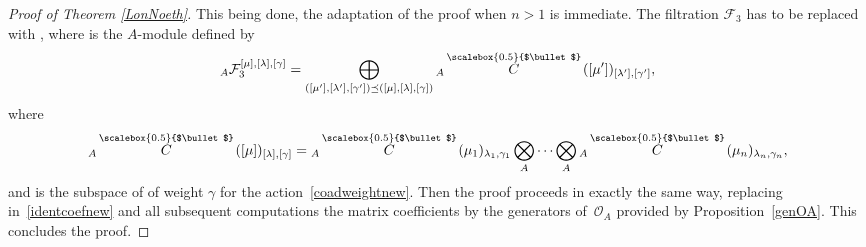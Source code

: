 \documentclass[pdftex]{sigma}
\numberwithin{equation}{section}
\theoremstyle{definition}
\newcommand{\Oo}{{\mathcal O}}
\newcommand{\smallbullet}{%
\vcenter{\hbox{\,\scalebox{0.5}{$\bullet$}\,}}
}
\begin{document}
\begin{proof}[Proof of Theorem \ref{LonNoeth}]
This being done, the adaptation of the proof when $n>1$ is immediate. The filtration $\mathcal{F}_3$ has to be replaced with , where  is the $A$-module defined by
\[
{}_A{\mathcal F}_3^{[\mu],[\lambda],[\gamma]}=\bigoplus_{([\mu'],[\lambda'],[\gamma'])\preceq ([\mu],[\lambda],[\gamma])} {}_A \overset{\raisebox{-1.5pt}{\scriptsize$\smallbullet$}}{C} ([\mu'])_{[\lambda'],[\gamma']},
\]
where
\[
{}_A \overset{\raisebox{-1.5pt}{\scriptsize$\smallbullet$}}{C} ([\mu])_{[\lambda],[\gamma]} ={}_A \overset{\raisebox{-1.5pt}{\scriptsize$\smallbullet$}}{C} (\mu_1)_{\lambda_1,\gamma_1}\bigotimes_A \dots \bigotimes_A {}_A \overset{\raisebox{-1.5pt}{\scriptsize$\smallbullet$}}{C} (\mu_n)_{\lambda_n,\gamma_n},
\]
 and \smash{${}_A \overset{\raisebox{-1.5pt}{\scriptsize$\smallbullet$}}{C} (\mu)_{\lambda,\gamma}$} is the subspace of \smash{${}_A \overset{\raisebox{-1.5pt}{\scriptsize$\smallbullet$}}{C} (\mu)_{\lambda}$} of weight $\gamma$ for the action~\eqref{coadweightnew}. Then the proof proceeds in exactly the same way, replacing in~\eqref{identcoefnew} and all subsequent computations the matrix coefficients by the generators of~$\Oo_A$ provided by Proposition~\ref{genOA}. This concludes the proof.
\end{proof}
\end{document}
